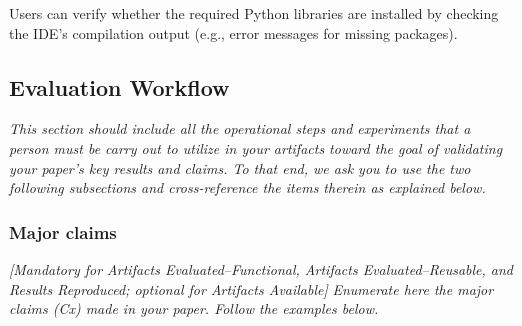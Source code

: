 \documentclass[sigconf]{acmart}
\begin{document}
Users can verify whether the required Python libraries are installed by checking the IDE's compilation output (e.g., error messages for missing packages).


\subsection{Evaluation Workflow}

\emph{This section should include all the operational steps and
experiments that a person must be carry out to utilize in your
artifacts toward the goal of validating your paper's key results and
claims.  To that end, we ask you to use the two following subsections
and cross-reference the items therein as explained below.}


\subsubsection{Major claims}

\emph{[Mandatory for \emph{Artifacts Evaluated--Functional},
  \emph{Artifacts Evaluated--Reusable}, and \emph{Results Reproduced};
  optional for \emph{Artifacts Available}]}
%
\emph{Enumerate here the major claims (Cx) made in your paper.  Follow
the examples below.}
\bigskip
\end{document}

